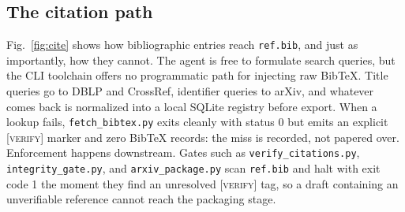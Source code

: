 \documentclass[conference]{IEEEtran}
\begin{document}
\subsection{The citation path}
Fig.~\ref{fig:cite} shows how bibliographic entries reach \texttt{ref.bib}, and just as importantly, how they cannot. The agent is free to formulate search queries, but the CLI toolchain offers no programmatic path for injecting raw BibTeX. Title queries go to DBLP and CrossRef, identifier queries to arXiv, and whatever comes back is normalized into a local SQLite registry before export. When a lookup fails, \texttt{fetch\_bibtex.py} exits cleanly with status 0 but emits an explicit \textsc{[verify]} marker and zero BibTeX records: the miss is recorded, not papered over. Enforcement happens downstream. Gates such as \texttt{verify\_citations.py}, \texttt{integrity\_gate.py}, and \texttt{arxiv\_package.py} scan \texttt{ref.bib} and halt with exit code 1 the moment they find an unresolved \textsc{[verify]} tag, so a draft containing an unverifiable reference cannot reach the packaging stage.
\end{document}
